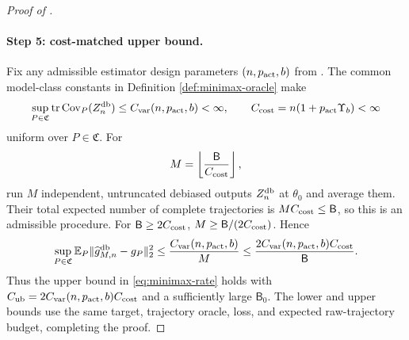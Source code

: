 \begin{proof}[Proof of ]
\paragraph{Step 5: cost-matched upper bound.}
Fix any admissible estimator design parameters $(n,p_{\rm act},b)$ from .  The common model-class constants in Definition \ref{def:minimax-oracle} make
\[
 \sup_{P\in\mathfrak C}\operatorname{tr}\operatorname{Cov}_P(Z_n^{\mathrm{db}})\le C_{\rm var}(n,p_{\rm act},b)<\infty,
 \qquad
 C_{\rm cost}=n(1+p_{\rm act} \Upsilon_b)<\infty
\]
uniform over $P\in\mathfrak C$.  For
\[
 M=\left\lfloor\frac{\mathsf B}{C_{\rm cost}}\right\rfloor,
\]
run $M$ independent, untruncated debiased outputs $Z_n^{\mathrm{db}}$ at $\theta_0$ and average them.  Their total expected number of complete trajectories is $MC_{\rm cost}\le \mathsf B$, so this is an admissible procedure.  For $\mathsf B\ge2C_{\rm cost}$,
$M\ge \mathsf B/(2C_{\rm cost})$.  Hence
\[
 \sup_{P\in\mathfrak C}
 \mathbb E_P\lVert\widehat g_{M,n}^{\mathrm{db}}-g_P\rVert_2^2
 \le\frac{C_{\rm var}(n,p_{\rm act},b)}{M}
 \le\frac{2C_{\rm var}(n,p_{\rm act},b)C_{\rm cost}}{\mathsf B}.
\]
Thus the upper bound in \eqref{eq:minimax-rate} holds with
$C_{\rm ub}=2C_{\rm var}(n,p_{\rm act},b)C_{\rm cost}$ and a sufficiently large $\mathsf B_0$.  The lower and upper bounds use the same target, trajectory oracle, loss, and expected raw-trajectory budget, completing the proof.
\end{proof}
